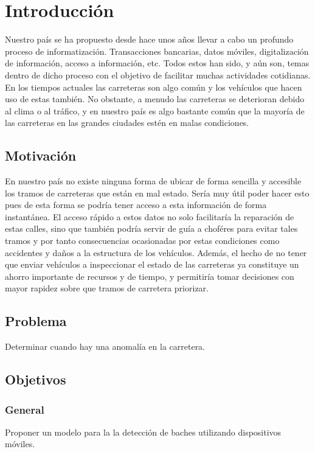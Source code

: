 \chapter*{Introducción}\label{chapter:introduction}

Nuestro país se ha propuesto desde hace unos años llevar a cabo un profundo proceso de informatización.
Transacciones bancarias, datos móviles, digitalización de información, acceso a información, etc. Todos
estos han sido, y aún son, temas dentro de dicho proceso con el objetivo de facilitar muchas actividades
cotidianas. En los tiempos actuales las carreteras son algo común y los vehículos que hacen uso de estas
también. No obstante, a menudo las carreteras se deterioran debido al clima o al tráfico, y en nuestro
país es algo bastante común que la mayoría de las carreteras en las grandes ciudades estén en malas condiciones.

\section*{Motivación}
En nuestro país no existe ninguna forma de ubicar de forma sencilla y accesible los tramos de carreteras que están
en mal estado. Sería muy útil poder hacer esto pues de esta forma se podría tener acceso a esta información de forma
instantánea. El acceso rápido a estos datos no solo facilitaría la reparación de estas calles, sino que también podría
servir de guía a choféres para evitar tales tramos y por tanto consecuencias ocasionadas por estas condiciones como 
accidentes y daños a la estructura de los vehículos. Además, el hecho de no tener que enviar vehículos a inspeccionar
el estado de las carreteras ya constituye un ahorro importante de recursos y de tiempo, y permitiría tomar decisiones 
con mayor rapidez sobre que tramos de carretera priorizar.

\section*{Problema}
Determinar cuando hay una anomalía en la carretera.

\section*{Objetivos}
\subsection*{General}
Proponer un modelo para la la detección de baches utilizando dispositivos móviles.


